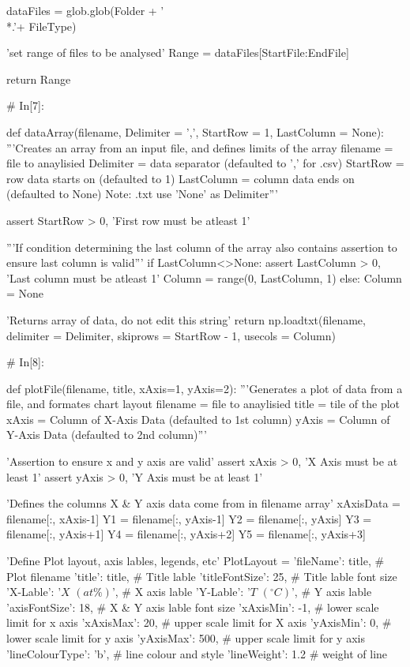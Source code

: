 \documentclass[a4paper,8pt]{article}
\begin{document}
\begin{python}
dataFiles = glob.glob(Folder + '\\*.'+ FileType)

'set range of files to be analysed'
Range = dataFiles[StartFile:EndFile]

return Range


# In[7]:

def dataArray(filename, Delimiter = ',', StartRow = 1, LastColumn = None):
'''Creates an array from an input file, and defines limits of the array
filename = file to anaylisied
Delimiter = data separator (defaulted to ',' for .csv)
StartRow = row data starts on (defaulted to 1)
LastColumn = column data ends on (defaulted to None)
Note: .txt use 'None' as Delimiter'''

assert StartRow > 0, 'First row must be atleast 1'

'''If condition determining the last column of the array
also contains assertion to ensure last column is valid'''
if LastColumn<>None:
assert LastColumn > 0, 'Last column must be atleast 1'
Column = range(0, LastColumn, 1)
else:
Column = None

'Returns array of data, do not edit this string'
return np.loadtxt(filename, delimiter = Delimiter,
skiprows = StartRow - 1, 
usecols = Column)


# In[8]:

def plotFile(filename, title, xAxis=1, yAxis=2):
'''Generates a plot of data from a file, and formates chart layout
filename = file to anaylisied
title = tile of the plot
xAxis = Column of X-Axis Data (defaulted to 1st column)
yAxis = Column of Y-Axis Data (defaulted to 2nd column)'''

'Assertion to ensure x and y axis are valid'
assert xAxis > 0, 'X Axis must be at least 1'
assert yAxis > 0, 'Y Axis must be at least 1'

'Defines the columns X & Y axis data come from in filename array'
xAxisData = filename[:, xAxis-1]
Y1 = filename[:, yAxis-1]
Y2 = filename[:, yAxis]
Y3 = filename[:, yAxis+1]
Y4 = filename[:, yAxis+2]
Y5 = filename[:, yAxis+3]

'Define Plot layout, axis lables, legends, etc'
PlotLayout = {'fileName': title, # Plot filename 
	'title': title, # Title lable
	'titleFontSize': 25, # Title lable font size
	'X-Lable': '$X$ $(at\%)$', # X axis lable
	'Y-Lable': '$T$  $(^{\circ}C)$', # Y axis lable
	'axisFontSize': 18, # X & Y axis lable font size
	'xAxisMin': -1, # lower scale limit for x axis
	'xAxisMax': 20, # upper scale limit for X axis
	'yAxisMin': 0, # lower scale limit for y axis
	'yAxisMax': 500, # upper scale limit for y axis
	'lineColourType': 'b', # line colour and style
	'lineWeight': 1.2 # weight of line
}


\end{python}
\end{document}
